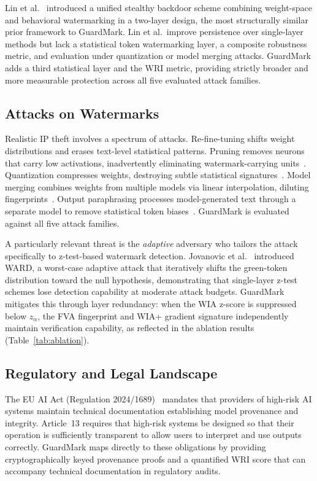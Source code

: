 \documentclass[journal,compsoc]{IEEEtran}
\begin{document}
Lin et al.~\cite{lin2024towards} introduced a unified stealthy backdoor scheme
combining weight-space and behavioral watermarking in a two-layer design,
the most structurally similar prior framework to GuardMark. Lin et al.\ improve
persistence over single-layer methods but lack a statistical token watermarking
layer, a composite robustness metric, and evaluation under quantization or
model merging attacks. GuardMark adds a third statistical layer and the WRI
metric, providing strictly broader and more measurable protection across all
five evaluated attack families.

\subsection{Attacks on Watermarks}

Realistic IP theft involves a spectrum of attacks. Re-fine-tuning shifts weight
distributions and erases text-level statistical patterns. Pruning removes
neurons that carry low activations, inadvertently eliminating watermark-carrying
units~\cite{oliynyk2023know}. Quantization compresses weights, destroying
subtle statistical signatures~\cite{saberi2024robustness}. Model merging
combines weights from multiple models via linear interpolation, diluting
fingerprints~\cite{yang2023certifiably}. Output paraphrasing processes
model-generated text through a separate model to remove statistical token
biases~\cite{liu2023watermarking}. GuardMark is evaluated against all five
attack families.

A particularly relevant threat is the \emph{adaptive} adversary who tailors
the attack specifically to z-test-based watermark detection.
Jovanovic et al.~\cite{jovanovic2024ward} introduced WARD, a worst-case
adaptive attack that iteratively shifts the green-token distribution toward
the null hypothesis, demonstrating that single-layer z-test schemes lose
detection capability at moderate attack budgets. GuardMark mitigates this
through layer redundancy: when the WIA z-score is suppressed below
$z_\alpha$, the FVA fingerprint and WIA+ gradient signature independently
maintain verification capability, as reflected in the ablation results
(Table~\ref{tab:ablation}).

\subsection{Regulatory and Legal Landscape}

The EU AI Act (Regulation 2024/1689)~\cite{eu2024aiact} mandates that
providers of high-risk AI systems maintain technical documentation establishing
model provenance and integrity. Article~13 requires that high-risk systems be
designed so that their operation is sufficiently transparent to allow users to
interpret and use outputs correctly. GuardMark maps directly to these obligations
by providing cryptographically keyed provenance proofs and a quantified WRI score
that can accompany technical documentation in regulatory audits.
\end{document}
